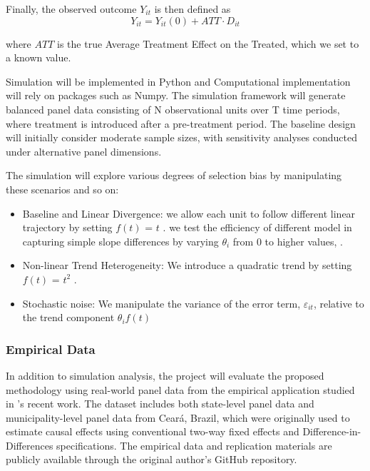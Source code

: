 \documentclass[12pt]{article}
\begin{document}
Finally, the observed outcome \(Y_{it}\) is then defined as
\begin{equation}
    Y_{it} = Y_{it}(0) + ATT \cdot D_{it}
    \label{eq:placeholder_label}
\end{equation}

where \(ATT\) is the true Average Treatment Effect on the Treated, which we set to a known value.

Simulation will be implemented in Python and Computational implementation will rely on packages such as Numpy. The simulation framework will generate balanced panel data consisting of N observational units over T time periods, where treatment is introduced after a pre-treatment period. The baseline design will initially consider moderate sample sizes, with sensitivity analyses conducted under alternative panel dimensions.

The simulation will explore various degrees of selection bias by manipulating these scenarios and so on:

\begin{itemize}
    \item Baseline and Linear Divergence: we allow each unit to follow different linear trajectory by setting \(f(t)\) = \(t\) . we test the efficiency of different model in capturing simple slope differences  by varying \(\theta_i\) from 0 to higher values, .
    \item Non-linear Trend Heterogeneity: We introduce a quadratic trend by setting  \(f(t)\) = \(t^2\) .
    \item Stochastic noise: We manipulate the variance of the error term, \(\varepsilon_{it}\), relative to the trend component  \(\theta_i f(t)\) 
\end{itemize}

\subsubsection{Empirical Data}

In addition to simulation analysis, the project will evaluate the proposed methodology using real-world panel data from the empirical application studied in \cite{mancha_when_2025}’s recent work. The dataset includes both state-level panel data and municipality-level panel data from Ceará, Brazil, which were originally used to estimate causal effects using conventional two-way fixed effects and Difference-in-Differences specifications. The empirical data and replication materials are publicly available through the original author’s GitHub repository. 
\end{document}
